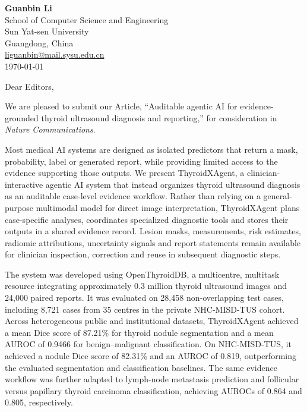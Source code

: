 \documentclass[10pt]{article}
\begin{document}
\begin{flushright}
\textbf{Guanbin Li}\\
School of Computer Science and Engineering\\
Sun Yat-sen University\\
Guangdong, China\\
\href{mailto:liguanbin@mail.sysu.edu.cn}{liguanbin@mail.sysu.edu.cn}\\[4pt]
\today
\end{flushright}

\vspace{-2pt}

\vspace{8pt}

Dear Editors,

We are pleased to submit our Article, ``Auditable agentic AI for evidence-grounded thyroid ultrasound diagnosis and reporting,'' for consideration in \textit{Nature Communications}.

Most medical AI systems are designed as isolated predictors that return a mask, probability, label or generated report, while providing limited access to the evidence supporting those outputs. We present ThyroidXAgent, a clinician-interactive agentic AI system that instead organizes thyroid ultrasound diagnosis as an auditable case-level evidence workflow. Rather than relying on a general-purpose multimodal model for direct image interpretation, ThyroidXAgent plans case-specific analyses, coordinates specialized diagnostic tools and stores their outputs in a shared evidence record. Lesion masks, measurements, risk estimates, radiomic attributions, uncertainty signals and report statements remain available for clinician inspection, correction and reuse in subsequent diagnostic steps.

The system was developed using OpenThyroidDB, a multicentre, multitask resource integrating approximately 0.3 million thyroid ultrasound images and 24,000 paired reports. It was evaluated on 28,458 non-overlapping test cases, including 8,721 cases from 35 centres in the private NHC-MISD-TUS cohort. Across heterogeneous public and institutional datasets, ThyroidXAgent achieved a mean Dice score of 87.21\% for thyroid nodule segmentation and a mean AUROC of 0.9466 for benign--malignant classification. On NHC-MISD-TUS, it achieved a nodule Dice score of 82.31\% and an AUROC of 0.819, outperforming the evaluated segmentation and classification baselines. The same evidence workflow was further adapted to lymph-node metastasis prediction and follicular versus papillary thyroid carcinoma classification, achieving AUROCs of 0.864 and 0.805, respectively.
\end{document}
